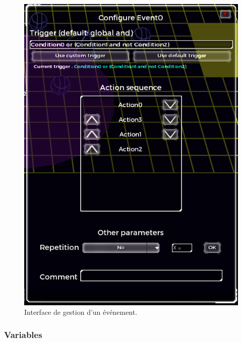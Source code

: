 \documentclass[a4paper]{article}
\begin{document}
\begin{figure}[H]
\centering
\includegraphics[width=\linewidth]{editor-eventconfig.png}
\caption{Interface de gestion d'un événement.}
\label{fig:editor-eventconfig}
\end{figure}
\subsubsection{Variables}
\end{document}
